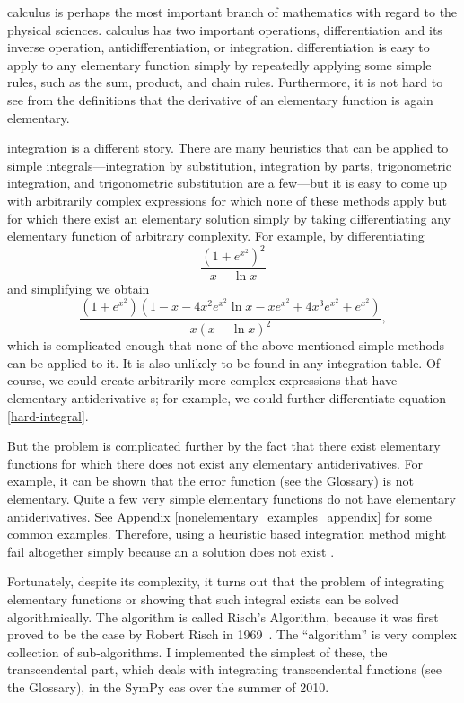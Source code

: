 \Gls{calculus} is perhaps the most important branch of mathematics with
regard to the physical sciences.  \Gls{calculus} has two important
operations, \gls{differentiation} and its inverse operation,
antidifferentiation, or \gls{integration}.  \Gls{differentiation} is
easy to apply to any \gls{elementary} function simply by repeatedly
applying some simple rules, such as the sum, product, and chain rules.
Furthermore, it is not hard to see from the definitions that the
derivative of an \gls{elementary} function is again \gls{elementary}.

\Gls{integration} is a different story.  There are many heuristics that
can be applied to simple integrals---\gls{integration} by substitution,
\gls{integration} by parts, trigonometric \gls{integration}, and
trigonometric substitution are a few---but it is easy to come up with
arbitrarily complex expressions for which none of these methods apply
but for which there exist an \gls{elementary} solution simply by taking
differentiating any elementary function of arbitrary complexity.  For
example, by differentiating
\begin{equation}
\label{hard-integral-sol}
    \frac{\left(1 + e^{x^{2}}\right)^{2}}{x - \ln{x}}
\end{equation}
and simplifying we obtain
\begin{equation}
\label{hard-integral}
    \frac{\left(1 + e^{x^{2}}\right) \left(1 - x - 4 x^{2} e^{x^{2}}
    \ln{x} - x e^{x^{2}} + 4 x^{3} e^{x^{2}} +
    e^{x^{2}}\right)}{x \left(x -
    \ln{x}\right)^{2}},
\end{equation}
which is complicated enough that none of the above mentioned simple
methods can be applied to it.  It is also unlikely to be found in any
integration table.  Of course, we could create arbitrarily more complex
expressions that have elementary antiderivative s; for example, we
could further differentiate equation \ref{hard-integral}. 

But the problem is complicated further by the fact that there exist
\gls{elementary} functions for which there does not exist any
\gls{elementary} antiderivatives.  For example, it can be shown that
the \gls{error function} (see the Glossary) is not elementary.  Quite a
few very simple elementary functions do not have elementary
antiderivatives.  See Appendix \ref{nonelementary_examples_appendix}
for some common examples. Therefore, using a heuristic based
\gls{integration} method might fail altogether simply because an a
solution does not exist .

Fortunately, despite its complexity, it turns out that the problem of
integrating elementary functions or showing that such integral exists
can be solved algorithmically.  The algorithm is called Risch's
Algorithm, because it was first proved to be the case by Robert Risch in
1969~\cite{risch1969problem}.  The ``algorithm'' is very complex
collection of sub-algorithms.  I implemented the simplest of these, the
\gls{transcendental} part, which deals with integrating
\gls{transcendental} functions (see the Glossary), in the SymPy
\gls{cas} over the summer of 2010.

